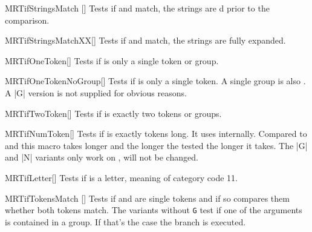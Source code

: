 \begin{describemacroTF}{MRTifStringsMatch}%
  []
  Tests if  and  match, the strings are
  d prior to the comparison.
\end{describemacroTF}

\begin{describemacroTF}[G]{MRTifStringsMatchXX}[]
  Tests if  and  match, the strings are fully
  expanded.
\end{describemacroTF}

\begin{describemacroTF}[G,N,GN]{MRTifOneToken}[]
  Tests if  is only a single token or group.
\end{describemacroTF}

\begin{describemacroTF}[N]{MRTifOneTokenNoGroup}[]
  Tests if  is only a single token. A single group is also
  . A |G| version is not supplied for obvious reasons.
\end{describemacroTF}

\begin{describemacroTF}[G,N,GN]{MRTifTwoToken}[]
  Tests if  is exactly two tokens or groups.
\end{describemacroTF}

\begin{describemacroTF}[G,N,GN]{MRTifNumToken}[]
  Tests if  is exactly  tokens long. It uses
   internally. Compared to  and
   this macro takes longer and the longer the tested
   the longer it takes. The |G| and |N| variants only work on
  ,  will not be changed.
\end{describemacroTF}

\begin{describemacroTF}[G,N,GN]{MRTifLetter}[]
  Tests if  is a letter, meaning of category code 11.
\end{describemacroTF}

\begin{describemacroTF}{MRTifTokensMatch}%
  []
  Tests if  and  are single tokens and if so compares
  them whether both tokens match. The variants without \texttt{G} test if one of
  the arguments is contained in a group. If that's the case the 
  branch is executed.
\end{describemacroTF}

